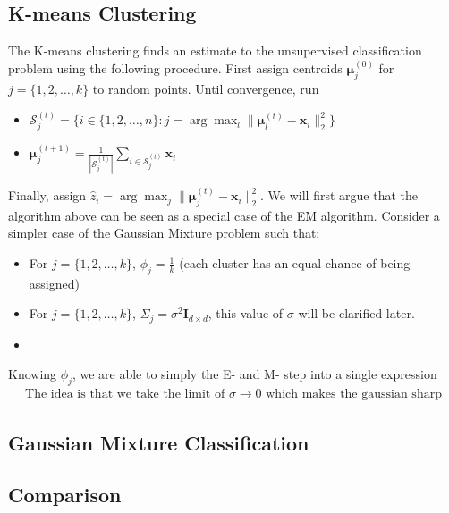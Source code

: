 \subsection{K-means Clustering}
The K-means clustering finds an estimate to the unsupervised classification problem using the following procedure. First assign centroids $\boldsymbol{\mu}_j^{(0)}$ for $j=\{1,2,\dots,k\}$ to random points. Until convergence, run
\begin{itemize}
    \item $\mathcal{S}_j^{(t)} = \{i\in\{1,2,\dots,n\}:j=\arg\max_l\|\boldsymbol{\mu}_l^{(t)}-\mathbf{x}_i\|_2^2\}$
    \item $\boldsymbol{\mu}_j^{(t+1)}=\frac{1}{|\mathcal{S}_j^{(t)}|}\sum_{i\in \mathcal{S}_j^{(t)}} \mathbf{x}_i$
\end{itemize}
Finally, assign $\hat{z}_i=\arg\max_j\|\boldsymbol{\mu}_j^{(t)}-\mathbf{x}_i\|_2^2$. We will first argue that the algorithm above can be seen as a special case of the EM algorithm. Consider a simpler case of the Gaussian Mixture problem such that:
\begin{itemize}
    \item For $j=\{1,2,\dots,k\}$, $\phi_j=\frac{1}{k}$ (each cluster has an equal chance of being assigned)
    \item For $j=\{1,2,\dots,k\}$, $\Sigma_j=\sigma^2\mathbf{I}_{d\times d}$, this value of $\sigma$ will be clarified later.
    \item 
\end{itemize}
Knowing $\phi_j$, we are able to simply the E- and M- step into a single expression
\begin{align*}
    \text{The idea is that we take the limit of }\sigma\rightarrow0\text{ which makes the gaussian sharp}
\end{align*}

\subsection{Gaussian Mixture Classification}
\subsection{Comparison}